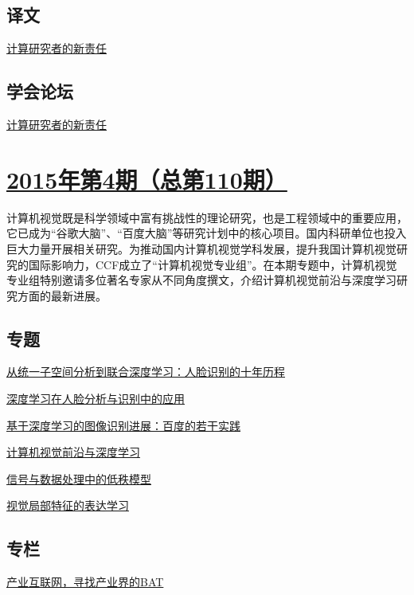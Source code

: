 \documentclass[a4paper]{article}
\begin{document}
\subsection{译文}
\href{http://history.ccf.org.cn/resources/1190201776262/2015/05/13/19.pdf}{计算研究者的新责任}

\subsection{学会论坛}
\href{http://history.ccf.org.cn/resources/1190201776262/2015/05/13/20.pdf}{计算研究者的新责任}


\section{\href{http://history.ccf.org.cn/sites/ccf/jsjtbbd.jsp?contentId=2857793951402}{\textbf{2015年第4期（总第110期）}}}
计算机视觉既是科学领域中富有挑战性的理论研究，也是工程领域中的重要应用，它已成为“谷歌大脑”、“百度大脑”等研究计划中的核心项目。国内科研单位也投入巨大力量开展相关研究。为推动国内计算机视觉学科发展，提升我国计算机视觉研究的国际影响力，CCF成立了“计算机视觉专业组”。在本期专题中，计算机视觉专业组特别邀请多位著名专家从不同角度撰文，介绍计算机视觉前沿与深度学习研究方面的最新进展。
\subsection{专题}
\href{http://history.ccf.org.cn/resources/1190201776262/2015/04/13/2.pdf}{从统一子空间分析到联合深度学习：人脸识别的十年历程}

\href{http://history.ccf.org.cn/resources/1190201776262/2015/04/13/3.pdf}{深度学习在人脸分析与识别中的应用}

\href{http://history.ccf.org.cn/resources/1190201776262/2015/04/13/6.pdf}{基于深度学习的图像识别进展：百度的若干实践}

\href{http://history.ccf.org.cn/resources/1190201776262/2015/04/13/1.pdf}{计算机视觉前沿与深度学习}

\href{http://history.ccf.org.cn/resources/1190201776262/2015/04/13/4.pdf}{信号与数据处理中的低秩模型}

\href{http://history.ccf.org.cn/resources/1190201776262/2015/04/13/5.pdf}{视觉局部特征的表达学习}

\subsection{专栏}
\href{http://history.ccf.org.cn/resources/1190201776262/2015/04/13/10.pdf}{产业互联网，寻找产业界的BAT}
\end{document}
